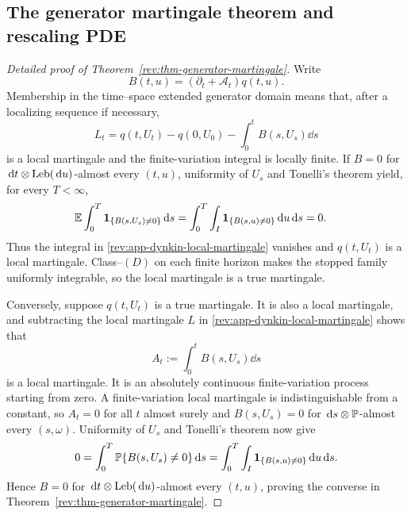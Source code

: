 \subsection{The generator martingale theorem and rescaling PDE}
\label{rev:app-generator-martingale-proof}

\begin{proof}[Detailed proof of Theorem~\ref{rev:thm-generator-martingale}]
Write
\[
B(t,u)=(\partial_t+\mathcal A_t)q(t,u).
\]
Membership in the time--space extended generator domain means that, after a
localizing sequence if necessary,
\begin{equation}
L_t=q(t,U_t)-q(0,U_0)-\int_0^tB(s,U_s)\dd s
\label{rev:app-dynkin-local-martingale}
\end{equation}
is a local martingale and the finite-variation integral is locally finite.
If $B=0$ for $\,\mathrm d t\otimes\operatorname{Leb}(\,\mathrm d u)$-almost every $(t,u)$, uniformity of
$U_s$ and Tonelli's theorem yield, for every $T<\infty$,
\begin{align*}
\mathbb E\int_0^T\mathbf 1_{\{B(s,U_s)\ne0\}}\,\mathrm d s
&=\int_0^T\int_I\mathbf 1_{\{B(s,u)\ne0\}}\,\mathrm d u\,\mathrm d s=0.
\end{align*}
Thus the integral in \eqref{rev:app-dynkin-local-martingale} vanishes and
$q(t,U_t)$ is a local martingale.  Class--$(D)$ on each finite horizon makes
the stopped family uniformly integrable, so the local martingale is a true
martingale.

Conversely, suppose $q(t,U_t)$ is a true martingale.  It is also a local
martingale, and subtracting the local martingale $L$ in
\eqref{rev:app-dynkin-local-martingale} shows that
\[
A_t:=\int_0^tB(s,U_s)\dd s
\]
is a local martingale.  It is an absolutely continuous finite-variation
process starting from zero.  A finite-variation local martingale is
indistinguishable from a constant, so $A_t=0$ for all $t$ almost surely and
$B(s,U_s)=0$ for $\,\mathrm d s\otimes\mathbb P$-almost every $(s,\omega)$.  Uniformity of
$U_s$ and Tonelli's theorem now give
\[
0=\int_0^T\mathbb P\{B(s,U_s)\ne0\}\,\mathrm d s
=\int_0^T\int_I\mathbf 1_{\{B(s,u)\ne0\}}\,\mathrm d u\,\mathrm d s.
\]
Hence $B=0$ for $\,\mathrm d t\otimes\operatorname{Leb}(\,\mathrm d u)$-almost every $(t,u)$, proving the
converse in Theorem~\ref{rev:thm-generator-martingale}.
\end{proof}

